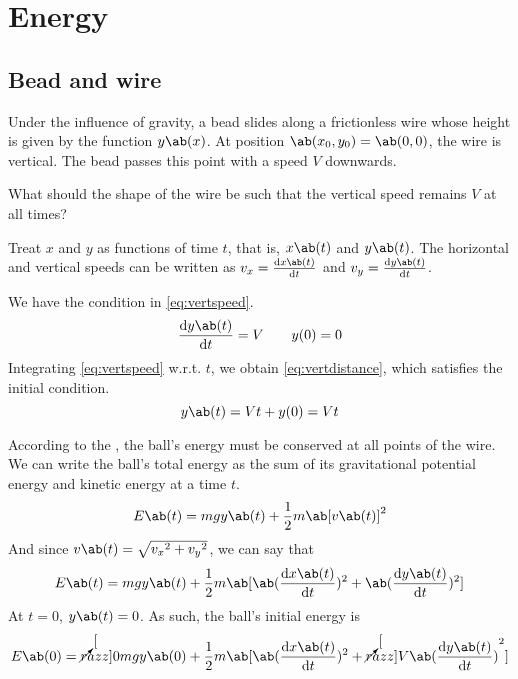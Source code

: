 \chapter{Energy}

\section{Bead and wire}
\begin{problem}
  Under the influence of gravity, a bead slides along a frictionless wire whose
  height is given by the function \(y\ab(x)\). At position \(\ab(x_0,
  y_0) = \ab(0,0)\),
  the wire is vertical. The bead passes this point with a speed
  \(V\) downwards.

  What should the shape of the wire be such that the vertical speed
  remains \(V\) at all times?
\end{problem}

Treat \(x\) and \(y\) as functions of time \(t\), that is,
\(x\ab(t)\) and \(y\ab(t)\). The horizontal and vertical speeds can
be written as \(v_x = \odv{x\ab(t)}{t}\) and \(v_y = \odv{y\ab(t)}{t}\).

We have the condition in \cref{eq:vertspeed}.
\begin{equation}
  \odv{y\ab(t)}{t} = V\qquad y(0) = 0
  \label{eq:vertspeed}
\end{equation}
Integrating \cref{eq:vertspeed} w.r.t. \(t\), we obtain
\cref{eq:vertdistance}, which satisfies the initial condition.
\begin{equation}
  y\ab(t) = Vt + y(0) = Vt
  \label{eq:vertdistance}
\end{equation}

According to the , the ball's
energy must be conserved at all points of the wire. We can write the
ball's total energy as the sum of its gravitational potential energy
and kinetic energy at a time \(t\).
\begin{equation*}
  E\ab(t) = mgy\ab(t) + \f{1}{2}m\ab[v\ab(t)]^2
\end{equation*}
And since \(v\ab(t) = \sqrt{{v_x}^2 + {v_y}^2}\), we can say that
\begin{equation}
  E\ab(t) = mgy\ab(t) + \f{1}{2}m\ab[\ab(\odv{x\ab(t)}{t})^2 +
  \ab(\odv{y\ab(t)}{t})^2]
\end{equation}
At \(t = 0\), \(y\ab(t) = 0\). As such, the ball's initial energy is
\begin{align*}
  E\ab(0) = \cancelto[razz]{0}{mgy\ab(0)} +
  \f{1}{2}m\ab[\ab(\odv{x\ab(t)}{t})^2 +
  \cancelto[razz]{V}{\ab(\odv{y\ab(t)}{t})}^2]
\end{align*}
